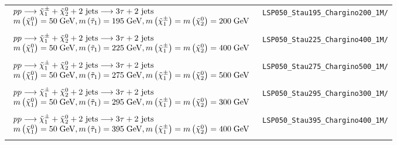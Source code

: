 \begin{table}[ht]
{\begin{tabular}{| l | l |}
			$\begin{array}{l}
			pp \longrightarrow \tilde{\chi}^{\pm}_{1} + \tilde{\chi}^{0}_{2} + 2\text{ jets} \longrightarrow 3\tau + 2\text{ jets} \\
			m\left(\tilde{\chi}^{0}_{1}\right) = 50\;\text{Ge}\kern-0.06667em\text{V}, 
			m\left(\tilde{\tau}_{1}\right) = 195\;\text{Ge}\kern-0.06667em\text{V},
			m\left(\tilde{\chi}^{\pm}_{1}\right)  = m\left(\tilde{\chi}^{0}_{2}\right) = 200\;\text{Ge}\kern-0.06667em\text{V} \\
			\end{array}$ & \texttt{LSP050\_Stau195\_Chargino200\_1M/}	\\
			&\\	
			
			$\begin{array}{l}
			pp \longrightarrow \tilde{\chi}^{\pm}_{1} + \tilde{\chi}^{0}_{2} + 2\text{ jets} \longrightarrow 3\tau + 2\text{ jets} \\
			m\left(\tilde{\chi}^{0}_{1}\right) = 50\;\text{Ge}\kern-0.06667em\text{V}, 
			m\left(\tilde{\tau}_{1}\right) = 225\;\text{Ge}\kern-0.06667em\text{V},
			m\left(\tilde{\chi}^{\pm}_{1}\right)  = m\left(\tilde{\chi}^{0}_{2}\right) = 400\;\text{Ge}\kern-0.06667em\text{V} \\
			\end{array}$ & \texttt{LSP050\_Stau225\_Chargino400\_1M/}	\\
			&\\	

			$\begin{array}{l}
			pp \longrightarrow \tilde{\chi}^{\pm}_{1} + \tilde{\chi}^{0}_{2} + 2\text{ jets} \longrightarrow 3\tau + 2\text{ jets} \\
			m\left(\tilde{\chi}^{0}_{1}\right) = 50\;\text{Ge}\kern-0.06667em\text{V}, 
			m\left(\tilde{\tau}_{1}\right) = 275\;\text{Ge}\kern-0.06667em\text{V},
			m\left(\tilde{\chi}^{\pm}_{1}\right)  = m\left(\tilde{\chi}^{0}_{2}\right) = 500\;\text{Ge}\kern-0.06667em\text{V} \\
			\end{array}$ & \texttt{LSP050\_Stau275\_Chargino500\_1M/}	\\
			&\\	

			$\begin{array}{l}
			pp \longrightarrow \tilde{\chi}^{\pm}_{1} + \tilde{\chi}^{0}_{2} + 2\text{ jets} \longrightarrow 3\tau + 2\text{ jets} \\
			m\left(\tilde{\chi}^{0}_{1}\right) = 50\;\text{Ge}\kern-0.06667em\text{V}, 
			m\left(\tilde{\tau}_{1}\right) = 295\;\text{Ge}\kern-0.06667em\text{V},
			m\left(\tilde{\chi}^{\pm}_{1}\right)  = m\left(\tilde{\chi}^{0}_{2}\right) = 300\;\text{Ge}\kern-0.06667em\text{V} \\
			\end{array}$ & \texttt{LSP050\_Stau295\_Chargino300\_1M/}	\\
			&\\			
		
			$\begin{array}{l}
			pp \longrightarrow \tilde{\chi}^{\pm}_{1} + \tilde{\chi}^{0}_{2} + 2\text{ jets} \longrightarrow 3\tau + 2\text{ jets} \\
			m\left(\tilde{\chi}^{0}_{1}\right) = 50\;\text{Ge}\kern-0.06667em\text{V}, 
			m\left(\tilde{\tau}_{1}\right) = 395\;\text{Ge}\kern-0.06667em\text{V},
			m\left(\tilde{\chi}^{\pm}_{1}\right)  = m\left(\tilde{\chi}^{0}_{2}\right) = 400\;\text{Ge}\kern-0.06667em\text{V} \\
			\end{array}$ & \texttt{LSP050\_Stau395\_Chargino400\_1M/}	\\
			&\\


\end{tabular}}
\end{table}
